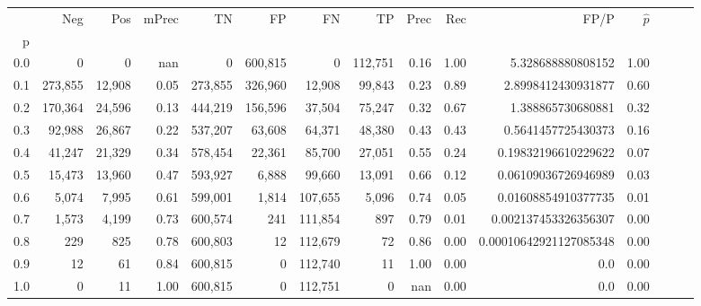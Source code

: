 \begin{tabular}{rrrrrrrrrrrrrrr}
\toprule
{} &      Neg &     Pos & mPrec &       TN &       FP &       FN &       TP &  Prec &   Rec &                    FP/P & $\hat{p}$ \\
p   &          &         &       &          &          &          &          &       &       &                         &           \\
\midrule
0.0 &        0 &       0 &   nan &        0 &  600,815 &        0 &  112,751 &  0.16 &  1.00 &       5.328688880808152 &      1.00 \\
0.1 &  273,855 &  12,908 &  0.05 &  273,855 &  326,960 &   12,908 &   99,843 &  0.23 &  0.89 &      2.8998412430931877 &      0.60 \\
0.2 &  170,364 &  24,596 &  0.13 &  444,219 &  156,596 &   37,504 &   75,247 &  0.32 &  0.67 &       1.388865730680881 &      0.32 \\
0.3 &   92,988 &  26,867 &  0.22 &  537,207 &   63,608 &   64,371 &   48,380 &  0.43 &  0.43 &      0.5641457725430373 &      0.16 \\
0.4 &   41,247 &  21,329 &  0.34 &  578,454 &   22,361 &   85,700 &   27,051 &  0.55 &  0.24 &     0.19832196610229622 &      0.07 \\
0.5 &   15,473 &  13,960 &  0.47 &  593,927 &    6,888 &   99,660 &   13,091 &  0.66 &  0.12 &     0.06109036726946989 &      0.03 \\
0.6 &    5,074 &   7,995 &  0.61 &  599,001 &    1,814 &  107,655 &    5,096 &  0.74 &  0.05 &     0.01608854910377735 &      0.01 \\
0.7 &    1,573 &   4,199 &  0.73 &  600,574 &      241 &  111,854 &      897 &  0.79 &  0.01 &    0.002137453326356307 &      0.00 \\
0.8 &      229 &     825 &  0.78 &  600,803 &       12 &  112,679 &       72 &  0.86 &  0.00 &  0.00010642921127085348 &      0.00 \\
0.9 &       12 &      61 &  0.84 &  600,815 &        0 &  112,740 &       11 &  1.00 &  0.00 &                     0.0 &      0.00 \\
1.0 &        0 &      11 &  1.00 &  600,815 &        0 &  112,751 &        0 &   nan &  0.00 &                     0.0 &      0.00 \\
\bottomrule
\end{tabular}
